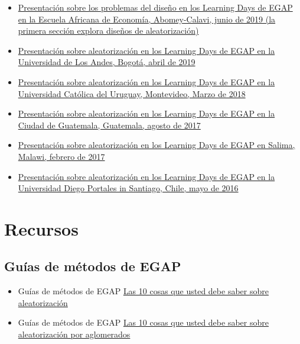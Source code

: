 \documentclass[12pt,spanish,]{book}
\begin{document}
\begin{itemize}
\item
  \href{https://egap.github.io/learningdays-resources/Slides/Examples/threats-benin.pdf}{Presentación sobre los problemas del diseño en los Learning Days de EGAP en la Escuela Africana de Economía, Abomey-Calavi, junio de 2019 (la primera sección explora diseños de aleatorización)}
\item
  \href{https://egap.github.io/learningdays-resources/Slides/Examples/randomization-bogota.pdf}{Presentación sobre aleatorización en los Learning Days de EGAP en la Universidad de Los Andes, Bogotá, abril de 2019}
\item
  \href{https://egap.github.io/learningdays-resources/Slides/Examples/randomization-montevideo.pdf}{Presentación sobre aleatorización en los Learning Days de EGAP en la Universidad Católica del Uruguay, Montevideo, Marzo de 2018}
\item
  \href{https://egap.github.io/learningdays-resources/Slides/Examples/randomization-guatemala.pdf}{Presentación sobre aleatorización en los Learning Days de EGAP en la Ciudad de Guatemala, Guatemala, agosto de 2017}
\item
  \href{https://egap.github.io/learningdays-resources/Slides/Examples/randomization-malawi.pdf}{Presentación sobre aleatorización en los Learning Days de EGAP en Salima, Malawi, febrero de 2017}
\item
  \href{https://egap.github.io/learningdays-resources/Slides/Examples/randomization-santiago.pdf}{Presentación sobre aleatorización en los Learning Days de EGAP en la Universidad Diego Portales in Santiago, Chile, mayo de 2016}
\end{itemize}

\hypertarget{recursos-2}{%
\section{Recursos}\label{recursos-2}}

\hypertarget{guuxedas-de-muxe9todos-de-egap-1}{%
\subsection{Guías de métodos de EGAP}\label{guuxedas-de-muxe9todos-de-egap-1}}

\begin{itemize}
\item
  Guías de métodos de EGAP \href{https://egap.org/es/resource/10-cosas-que-debe-saber-sobre-la-aleatorizacion/}{Las 10 cosas que usted debe saber sobre aleatorización}
\item
  Guías de métodos de EGAP \href{https://egap.org/es/resource/10-cosas-sobre-la-aleatorizacion-por-aglomerados/}{Las 10 cosas que usted debe saber sobre aleatorización por aglomerados}
\end{itemize}
\end{document}
